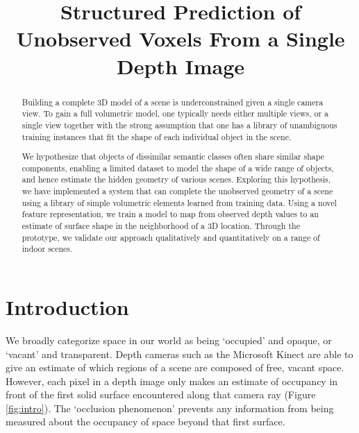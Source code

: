 \documentclass[10pt,twocolumn,letterpaper]{article}
\title{Structured Prediction of Unobserved Voxels From a Single Depth Image}
\begin{document}
\maketitle

\begin{abstract}

  Building a complete 3D model of a scene is underconstrained given a single camera view.
  To gain a full volumetric model, one typically needs either multiple views, or a single view together with the strong assumption that one has a library of unambiguous training instances that fit the shape of each individual object in the scene.

  We hypothesize that objects of dissimilar semantic classes often share similar shape components, enabling a limited dataset to model the shape of a wide range of objects, and hence estimate the hidden geometry of various scenes.
  Exploring this hypothesis, we have implemented a system that can complete the unobserved geometry of a scene using a library of simple volumetric elements learned from training data.
  Using a novel feature representation, we train a model to map from observed depth values to an estimate of surface shape in the neighborhood of a 3D location.
  Through the prototype, we validate our approach qualitatively and quantitatively on a range of indoor scenes.

\end{abstract}

\section{Introduction}


We broadly categorize space in our world as being `occupied' and opaque, or `vacant' and transparent.
Depth cameras such as the Microsoft Kinect are able to give an estimate of which regions of a scene are composed of free, vacant space.
However, each pixel in a depth image only makes an estimate of occupancy in front of the first solid surface encountered along that camera ray (Figure \ref{fig:intro}).
The `occlusion phenomenon' prevents any information from being measured about the occupancy of space beyond that first surface.
\end{document}

